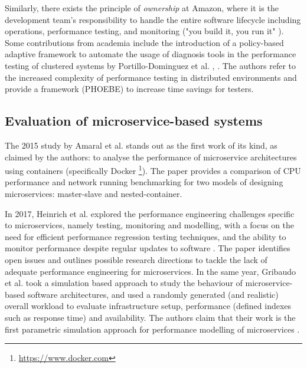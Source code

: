 Similarly, there exists the principle of \textit{ownership} at Amazon, where it is the development team's responsibility to handle the entire software lifecycle including operations, performance testing, and monitoring ("you build it, you run it" \cite{ohanlon06}). Some contributions from academia include the introduction of a policy-based adaptive framework to automate the usage of diagnosis tools in the performance testing of clustered systems by Portillo-Dominguez et al. \cite{portillo14}, \cite{portillo17}. The authors refer to the increased complexity of performance testing in distributed environments and provide a framework (PHOEBE) to increase time savings for testers.

\subsection{Evaluation of microservice-based systems}

The 2015 study by Amaral et al. \cite{amaral15} stands out as the first work of its kind, as claimed by the authors: to analyse the performance of microservice architectures using containers (specifically Docker \footnote{\url{https://www.docker.com}}). The paper provides a comparison of CPU performance and network running benchmarking for two models of designing microservices: master-slave and nested-container.

In 2017, Heinrich et al. explored the performance engineering challenges specific to microservices, namely testing, monitoring and modelling, with a focus on the need for efficient performance regression testing techniques, and the ability to monitor performance despite regular updates to software \cite{heinrich17}. The paper identifies open issues and outlines possible research directions to tackle the lack of adequate performance engineering for microservices.  In the same year, Gribaudo et al. took a simulation based approach to study the behaviour of microservice-based software architectures, and used a randomly generated (and realistic) overall workload to evaluate infrastructure setup, performance (defined indexes such as response time) and availability. The authors claim that their work is the first parametric simulation approach for performance modelling of microservices \cite{gribaudo17}.

